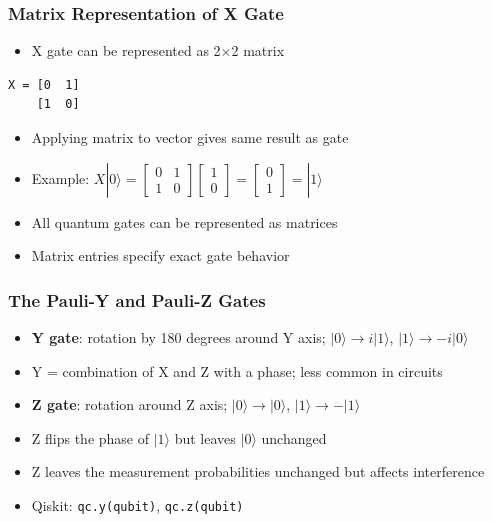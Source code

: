 \begin{frame}[fragile]\frametitle{Matrix Representation of X Gate}
\begin{itemize}
\item X gate can be represented as 2$\times$2 matrix
\end{itemize}
\begin{lstlisting}
X = [0  1]
    [1  0]
\end{lstlisting}
\begin{itemize}
\item Applying matrix to vector gives same result as gate
\item Example: $X|0\rangle = \begin{bmatrix} 0 & 1 \\ 1 & 0 \end{bmatrix} \begin{bmatrix} 1 \\ 0 \end{bmatrix} = \begin{bmatrix} 0 \\ 1 \end{bmatrix} = |1\rangle$
\item All quantum gates can be represented as matrices
\item Matrix entries specify exact gate behavior
\end{itemize}
\end{frame}

\begin{frame}[fragile]\frametitle{The Pauli-Y and Pauli-Z Gates}
\begin{itemize}
\item \textbf{Y gate}: rotation by 180 degrees around Y axis; $|0\rangle \to i|1\rangle$, $|1\rangle \to -i|0\rangle$
\item Y = combination of X and Z with a phase; less common in circuits
\item \textbf{Z gate}: rotation around Z axis; $|0\rangle \to |0\rangle$, $|1\rangle \to -|1\rangle$
\item Z flips the phase of $|1\rangle$ but leaves $|0\rangle$ unchanged
\item Z leaves the measurement probabilities unchanged but affects interference
\item Qiskit: \texttt{qc.y(qubit)}, \texttt{qc.z(qubit)}
\end{itemize}
\end{frame}

